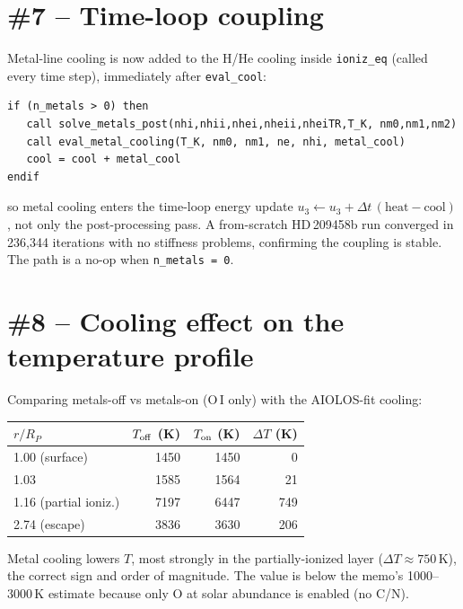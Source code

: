 \documentclass[english,a4paper]{kiseon_memo}
\begin{document}
\section{\#7 -- Time-loop coupling}

Metal-line cooling is now added to the H/He cooling inside
\texttt{ioniz\_eq} (called every time step), immediately after
\texttt{eval\_cool}:
\begin{lstlisting}
if (n_metals > 0) then
   call solve_metals_post(nhi,nhii,nhei,nheii,nheiTR,T_K, nm0,nm1,nm2)
   call eval_metal_cooling(T_K, nm0, nm1, ne, nhi, metal_cool)
   cool = cool + metal_cool
endif
\end{lstlisting}
so metal cooling enters the time-loop energy update
$u_3 \leftarrow u_3 + \Delta t\,(\mathrm{heat}-\mathrm{cool})$, not only
the post-processing pass.  A from-scratch HD\,209458b run converged in
236{,}344 iterations with no stiffness problems, confirming the coupling
is stable.  The path is a no-op when \texttt{n\_metals = 0}.

\section{\#8 -- Cooling effect on the temperature profile}

Comparing metals-off vs metals-on (O\,I only) with the AIOLOS-fit
cooling:
\begin{center}
\begin{tabular}{lrrr}
\toprule
$r/R_P$ & $T_{\rm off}$ (K) & $T_{\rm on}$ (K) & $\Delta T$ (K) \\
\midrule
1.00 (surface) & 1450 & 1450 & 0 \\
1.03           & 1585 & 1564 & 21 \\
1.16 (partial ioniz.) & 7197 & 6447 & 749 \\
2.74 (escape)  & 3836 & 3630 & 206 \\
\bottomrule
\end{tabular}
\end{center}
Metal cooling lowers $T$, most strongly in the partially-ionized layer
($\Delta T \approx 750$\,K), the correct sign and order of magnitude.
The value is below the memo's 1000--3000\,K estimate because only O at
solar abundance is enabled (no C/N).
\end{document}
